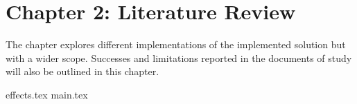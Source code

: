 \section{Chapter 2: Literature Review}
The chapter explores different implementations of the implemented solution but with a wider scope. Successes and limitations reported in the documents of study will also be outlined in this chapter.

{effects.tex}
{main.tex}